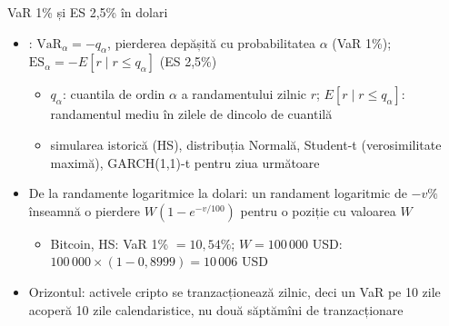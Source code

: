 \begin{frame}{VaR 1\% și ES 2,5\% în dolari}
\itemsize{\small}
\begin{itemize}
    \item {}: $\mathrm{VaR}_\alpha = -q_\alpha$, pierderea depășită cu probabilitatea $\alpha$ (VaR 1\%); $\mathrm{ES}_\alpha = -E[r \mid r \le q_\alpha]$ (ES 2,5\%)
    \begin{itemize}
        \item $q_\alpha$: cuantila de ordin $\alpha$ a randamentului zilnic $r$; $E[r \mid r \le q_\alpha]$: randamentul mediu în zilele de dincolo de cuantilă
        \item simularea istorică (HS), distribuția Normală, Student-t (verosimilitate maximă), GARCH(1,1)-t pentru ziua următoare
    \end{itemize}
    \item De la randamente logaritmice la dolari: un randament logaritmic de $-v\%$ înseamnă o pierdere $W(1 - e^{-v/100})$ pentru o poziție cu valoarea $W$
    \begin{itemize}
        \item Bitcoin, HS: VaR 1\% $= 10{,}54\%$; $W = 100\,000$ USD: $100\,000 \times (1 - 0{,}8999) = 10\,006$ USD
    \end{itemize}
    \item Orizontul: activele cripto se tranzacționează zilnic, deci un VaR pe 10 zile acoperă 10 zile calendaristice, nu două săptămîni de tranzacționare
\end{itemize}
\end{frame}

